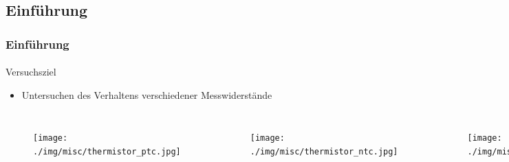 \subsection{Einführung} %
\label{sub:Einführung}
\begin{frame}
    \frametitle{Einführung}
    \framesubtitle{}
    \begin{block}{Versuchsziel}     
        \begin{itemize}
            \item Untersuchen des Verhaltens verschiedener Messwiderstände
        \end{itemize}
    \end{block}
    \begin{columns}[c]
            \begin{figure}[H]
            \begin{center}
                    \texttt{[image: ./img/misc/thermistor\_ptc.jpg]}
            \end{center}
            \end{figure}
            \begin{figure}[H]
            \begin{center}
                    \texttt{[image: ./img/misc/thermistor\_ntc.jpg]}
            \end{center}
            \end{figure}
            \begin{figure}[H]
            \begin{center}
                    \texttt{[image: ./img/misc/ldr.jpg]}
            \end{center}
            \end{figure}
            \begin{figure}[H]
            \begin{center}
                    \includegraphics[scale=0.1]{./img/misc/photodiode.jpg}

\end{center}
\end{figure}
\end{columns}
\end{frame}
